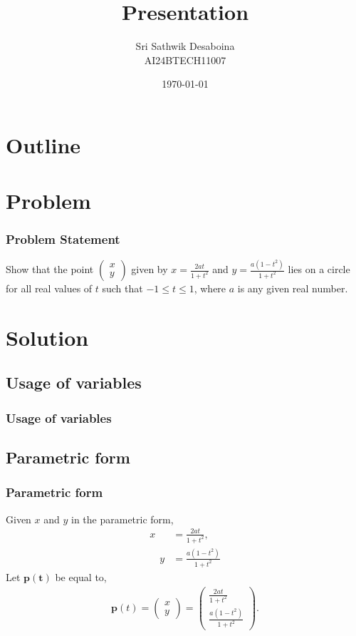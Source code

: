 \documentclass{beamer}
\title{Presentation}
\author{Sri Sathwik Desaboina \\ AI24BTECH11007}
\date{\today}
\theoremstyle{remark}
\newcommand{\myvec}[1]{\ensuremath{\begin{pmatrix}#1\end{pmatrix}}}
\let\vec\mathbf
\numberwithin{equation}{section}
\begin{document}
\begin{frame}
\titlepage
\end{frame}

\section*{Outline}
\begin{frame}
\tableofcontents
\end{frame}
\section{Problem}
\begin{frame}
\frametitle{Problem Statement}
%

Show that the point $\myvec{x \\ y}$ given by $x = \frac{2at}{1 + t^2}$ and $y = \frac{a(1 - t^2)}{1 + t^2}$ lies on a circle for all real values of $t$ such that $-1 \leq t \leq 1$, where $a$ is any given real number.
\end{frame}

\section{Solution}
\subsection{Usage of variables}
\begin{frame}
\frametitle{Usage of variables}
	
\end{frame}
\subsection{Parametric form}
\begin{frame}
\frametitle{Parametric form}
Given $x$ and $y$ in the parametric form,\\
	\begin{align}
		x &= \frac{2at}{1 + t^2},\\
		\quad y &= \frac{a(1 - t^2)}{1 + t^2}
	\end{align}
	Let $\vec{p(t)}$ be equal to,\\
	\begin{align}
	\mathbf{p}(t) = \myvec{x \\ y} = \myvec{\frac{2at}{1 + t^2} \\ \frac{a(1 - t^2)}{1 + t^2}}.
	\end{align}


\end{frame}
\end{document}

